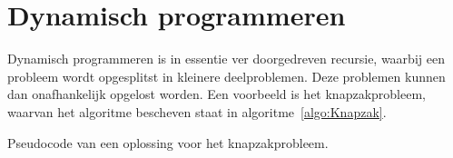 \chapter{Dynamisch programmeren}
Dynamisch programmeren is in essentie ver doorgedreven recursie, waarbij een probleem wordt opgesplitst in kleinere deelproblemen.
Deze problemen kunnen dan onafhankelijk opgelost worden.
Een voorbeeld is het knapzakprobleem, waarvan het algoritme bescheven staat in algoritme~\ref{algo:Knapzak}.



\begin{algorithm}
    \caption{Pseudocode van een oplossing voor het knapzakprobleem.}
    \label{algo:Knapzak}
    \begin{algorithmic}
         
             
                    \EndIf
                \EndIf
            \EndFor    
        \EndFor
    \end{algorithmic}
\end{algorithm}
